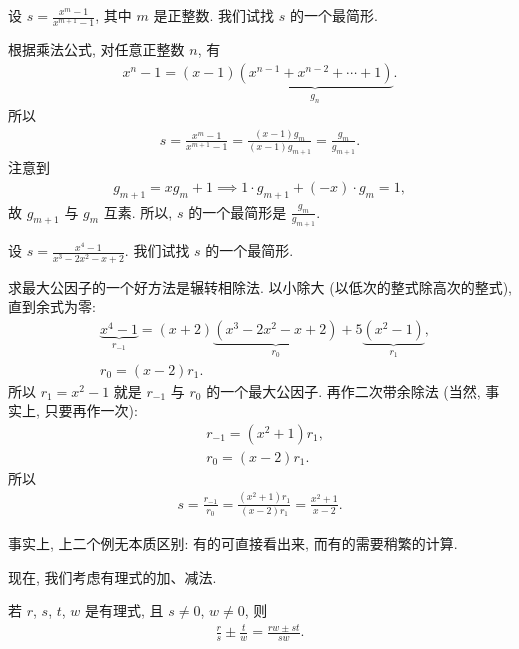 \begin{example}
    设 $s = \frac{x^{m} - 1}{x^{m+1} - 1}$, 其中 $m$ 是正整数. 我们试找 $s$ 的一个最简形.

    根据乘法公式, 对任意正整数 $n$, 有
    \begin{align*}
        x^n - 1 = (x - 1) \underbrace{(x^{n-1} + x^{n-2} + \cdots + 1)}_{g_n}.
    \end{align*}
    所以
    \begin{align*}
        s = \frac{x^{m} - 1}{x^{m+1} - 1} = \frac{(x - 1) g_{m}}{(x - 1) g_{m+1}} = \frac{g_{m}}{g_{m+1}}.
    \end{align*}
    注意到
    \begin{align*}
        g_{m+1} = xg_{m} + 1 \implies 1 \cdot g_{m+1} + (-x) \cdot g_{m} = 1,
    \end{align*}
    故 $g_{m+1}$ 与 $g_{m}$ 互素. 所以, $s$ 的一个最简形是 $\frac{g_{m}}{g_{m+1}}$.
\end{example}

\begin{example}
    设 $s = \frac{x^4 - 1}{x^3 - 2x^2 - x + 2}$. 我们试找 $s$ 的一个最简形.

    求最大公因子的一个好方法是辗转相除法. 以小除大 (以低次的整式除高次的整式), 直到余式为零:
    \begin{align*}
         & \underbrace{x^4 - 1}_{r_{-1}} = {(x + 2)\underbrace{(x^3 - 2x^2 - x + 2)}_{r_0}} + {5\underbrace{(x^2 - 1)}_{r_1}}, \\
         & r_0 = (x - 2) r_1.
    \end{align*}
    所以 $r_1 = x^2 - 1$ 就是 $r_{-1}$ 与 $r_0$ 的一个最大公因子. 再作二次带余除法 (当然, 事实上, 只要再作一次):
    \begin{align*}
         & r_{-1} = (x^2 + 1) r_1, \\
         & r_0 = (x - 2) r_1.
    \end{align*}
    所以
    \begin{align*}
        s = \frac{r_{-1}}{r_0} = \frac{(x^2 + 1) r_1}{(x - 2) r_1} = \frac{x^2 + 1}{x - 2}.
    \end{align*}
\end{example}

\begin{remark}
    事实上, 上二个例无本质区别: 有的可直接看出来, 而有的需要稍繁的计算.
\end{remark}

现在, 我们考虑有理式的加、减法.

\begin{proposition}
    若 $r$, $s$, $t$, $w$ 是有理式, 且 $s \neq 0$, $w \neq 0$, 则
    \begin{align*}
        \frac{r}{s} \pm \frac{t}{w} = \frac{rw \pm st}{sw}.
    \end{align*}
\end{proposition}

